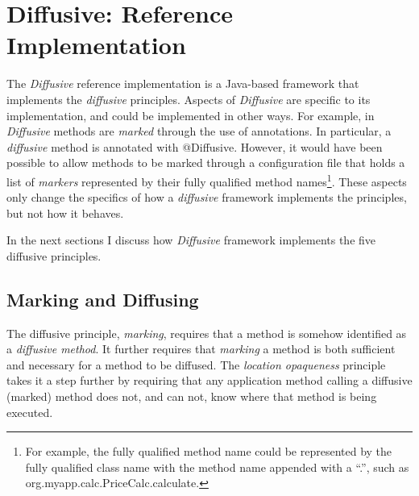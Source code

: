 \documentclass[11pt]{article}
\begin{document}
%
%
\section{Diffusive: Reference Implementation}
The \emph{Diffusive} reference implementation is a Java-based framework that implements the \emph{diffusive} principles. Aspects of \emph{Diffusive} are specific to its implementation, and could be implemented in other ways. For example, in \emph{Diffusive} methods are \emph{marked} through the use of annotations. In particular, a \emph{diffusive} method is annotated with \textsf{@Diffusive}. However, it would have been possible to allow methods to be marked through a configuration file that holds a list of \emph{markers} represented by their fully qualified method names\footnote{For example, the fully qualified method name could be represented by the fully qualified class name with the method name appended with a ``.'', such as \textsf{org.myapp.calc.PriceCalc.calculate}.}. These aspects only change the specifics of how a \emph{diffusive} framework implements the principles, but not how it behaves.

In the next sections I discuss how \emph{Diffusive} framework implements the five diffusive principles.

\subsection{Marking and Diffusing\label{sec:marking_and_diffusing}}
The diffusive principle, \emph{marking}, requires that a method is somehow identified as a \emph{diffusive method}. It further requires that \emph{marking} a method is both sufficient and necessary for a method to be diffused. The \emph{location opaqueness} principle takes it a step further by requiring that any application method calling a diffusive (marked) method does not, and can not, know where that method is being executed.

\end{document}

